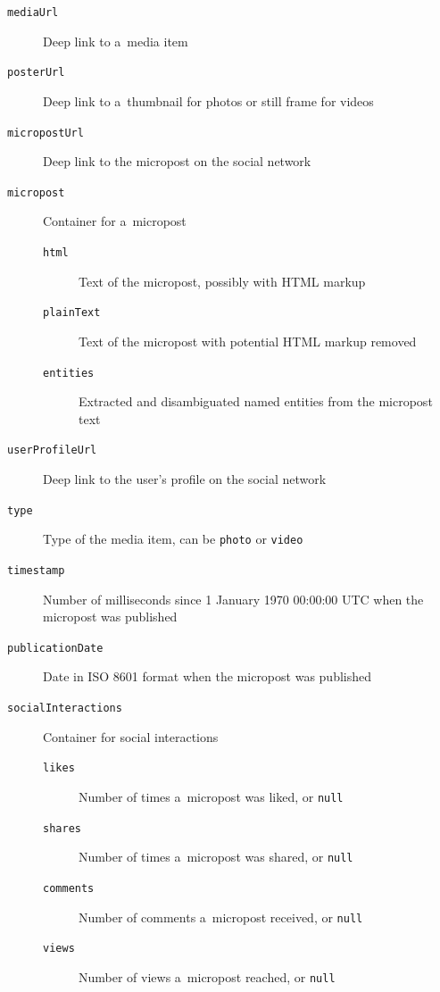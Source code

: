 \begin{description}
  \item[\texttt{mediaUrl}] Deep link to a~media item
  \item[\texttt{posterUrl}] Deep link to a~thumbnail for photos
    or still frame for videos
  \item[\texttt{micropostUrl}] Deep link to the micropost on
    the social network
  \item[\texttt{micropost}] Container for a~micropost
  \begin{description}
    \item[\texttt{html}] Text of the micropost,
      possibly with HTML      markup
    \item[\texttt{plainText}] Text of the micropost with
      potential HTML markup removed
    \item[\texttt{entities}] Extracted and disambiguated
      named entities from the micropost text
  \end{description}      
  \item[\texttt{userProfileUrl}] Deep link to the user's
    profile on the social network
  \item[\texttt{type}] Type of the media item,
    can be \texttt{photo} or \texttt{video}
  \item[\texttt{timestamp}] Number of milliseconds since
    1 January 1970 00:00:00 UTC when the micropost was
    published
  \item[\texttt{publicationDate}] Date in ISO 8601
    format when the micropost was published
  \item[\texttt{socialInteractions}] Container for social
    interactions
  \begin{description}  
  \item[\texttt{likes}] Number of times a~micropost was liked, or
    \texttt{null}
  \item[\texttt{shares}] Number of times a~micropost was shared, or
    \texttt{null}
  \item[\texttt{comments}] Number of comments a~micropost
    received, or \texttt{null}
  \item[\texttt{views}] Number of views a~micropost reached, or
    \texttt{null}
  \end{description}    
\end{description}

